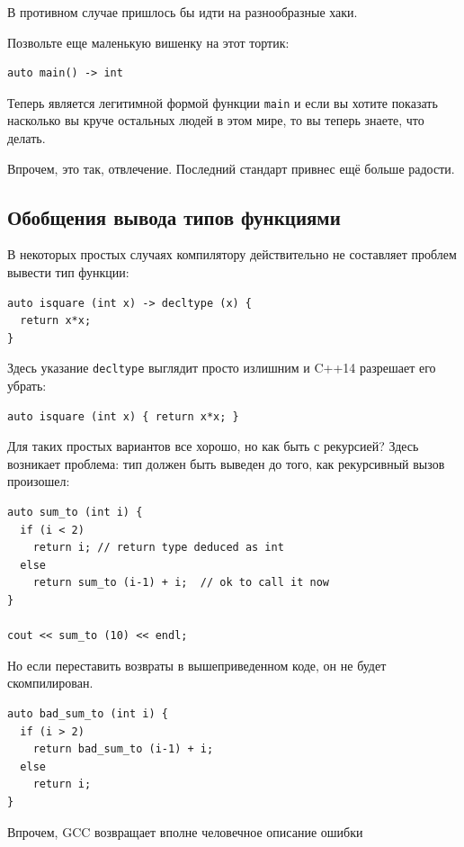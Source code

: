 \documentclass[a4paper,12pt,oneside]{book}
\begin{document}
В противном случае пришлось бы идти на разнообразные хаки.

Позвольте еще маленькую вишенку на этот тортик:

\begin{lstlisting}
auto main() -> int
\end{lstlisting}

Теперь является легитимной формой функции \lstinline!main! и если вы хотите показать насколько вы круче остальных людей в этом мире, то вы теперь знаете, что делать.

Впрочем, это так, отвлечение. Последний стандарт привнес ещё больше радости.

\subsection{Обобщения вывода типов функциями}\label{Auto14}

В некоторых простых случаях компилятору действительно не составляет проблем вывести тип функции: 

\begin{lstlisting}
auto isquare (int x) -> decltype (x) { 
  return x*x;
}
\end{lstlisting}

Здесь указание \lstinline!decltype! выглядит просто излишним и C++14 разрешает его убрать:

\begin{lstlisting}
auto isquare (int x) { return x*x; }
\end{lstlisting}

Для таких простых вариантов все хорошо, но как быть с рекурсией? Здесь возникает проблема: тип должен быть выведен до того, как рекурсивный вызов произошел:

\begin{lstlisting}
auto sum_to (int i) {
  if (i < 2)
    return i; // return type deduced as int
  else
    return sum_to (i-1) + i;  // ok to call it now
}

cout << sum_to (10) << endl;
\end{lstlisting}

Но если переставить возвраты в вышеприведенном коде, он не будет скомпилирован.

\begin{lstlisting}
auto bad_sum_to (int i) {
  if (i > 2)
    return bad_sum_to (i-1) + i;
  else
    return i;
}
\end{lstlisting}

Впрочем, GCC возвращает вполне человечное описание ошибки
\end{document}
